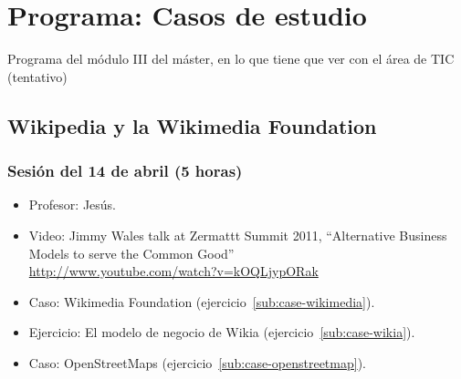 \documentclass[a4paper,12pt]{article}
\begin{document}



\section{Programa: Casos de estudio}

Programa del módulo III del máster, en lo que tiene que ver con el área de TIC (tentativo)

\subsection{Wikipedia y la Wikimedia Foundation}

\subsubsection{Sesión del 14 de abril (5 horas)}

\begin{itemize}
\item Profesor: Jesús.
\item Video: Jimmy Wales talk at Zermattt Summit 2011, ``Alternative Business Models to serve the Common Good'' \\
  \url{http://www.youtube.com/watch?v=kOQLjypORak}
\item Caso: Wikimedia Foundation (ejercicio~\ref{sub:case-wikimedia}).
\item Ejercicio: El modelo de negocio de Wikia (ejercicio~\ref{sub:case-wikia}).
\item Caso: OpenStreetMaps (ejercicio~\ref{sub:case-openstreetmap}).
\end{itemize}

\end{document}
